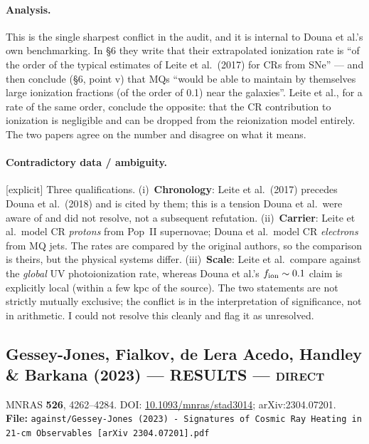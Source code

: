 \documentclass[11pt,a4paper]{article}
\newcommand{\RES}{\textcolor{red!60!black}{\textbf{RESULTS}}}
\newcommand{\flag}[1]{\textcolor{orange!75!black}{\textsf{\small [#1]}}}
\begin{document}
\paragraph{Analysis.}
This is the single sharpest conflict in the audit, and it is internal to
Douna et al.'s own benchmarking. In \S6 they write that their extrapolated
ionization rate is ``of the order of the typical estimates of Leite et al.\
(2017) for CRs from SNe'' --- and then conclude (\S6, point v) that MQs ``would
be able to maintain by themselves large ionization fractions (of the order of
0.1) near the galaxies''. Leite et al., for a rate of the same order, conclude
the opposite: that the CR contribution to ionization is negligible and can be
dropped from the reionization model entirely. The two papers agree on the
number and disagree on what it means.

\paragraph{Contradictory data / ambiguity.} \flag{explicit}
Three qualifications. (i)~\textbf{Chronology}: Leite et al.\ (2017) precedes
Douna et al.\ (2018) and is cited by them; this is a tension Douna et al.\ were
aware of and did not resolve, not a subsequent refutation.
(ii)~\textbf{Carrier}: Leite et al.\ model CR \emph{protons} from Pop~II
supernovae; Douna et al.\ model CR \emph{electrons} from MQ jets. The rates are
compared by the original authors, so the comparison is theirs, but the physical
systems differ.
(iii)~\textbf{Scale}: Leite et al.\ compare against the \emph{global} UV
photoionization rate, whereas Douna et al.'s $f_{\rm ion}\sim0.1$ claim is
explicitly local (within a few kpc of the source). The two statements are not
strictly mutually exclusive; the conflict is in the interpretation of
significance, not in arithmetic. I could not resolve this cleanly and flag it
as unresolved.

\subsection{Gessey-Jones, Fialkov, de Lera Acedo, Handley \& Barkana (2023) --- \RES{} --- \textsc{direct}}
\noindent MNRAS \textbf{526}, 4262--4284. DOI:
\href{https://doi.org/10.1093/mnras/stad3014}{10.1093/mnras/stad3014};
arXiv:2304.07201.\\
\textbf{File:} \texttt{against/Gessey-Jones (2023) - Signatures of Cosmic Ray Heating in 21-cm Observables [arXiv 2304.07201].pdf}
\end{document}
